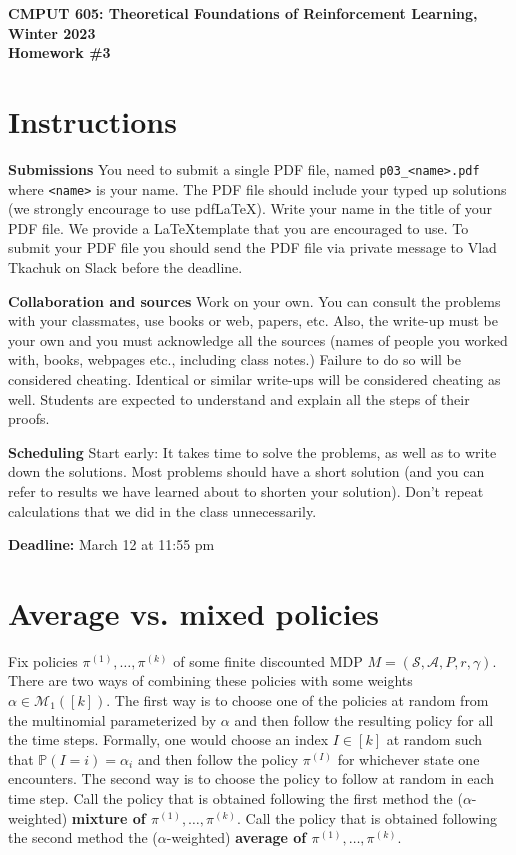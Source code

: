 \documentclass{article}
\newcommand{\hwnumber}{3}
\DeclareMathOperator*{\1}{\mathbbm{1}}
\newcommand{\Prob}[1]{\mathbb{P}( #1 )}
\newcommand{\0}{\mathbf{0}}
\theoremstyle{definition}
\theoremstyle{remark}
\theoremstyle{theorem}
\newcommand{\cS}{\mathcal{S}}
\newcommand{\cA}{\mathcal{A}}
\begin{document}
\begin{center}
{\Large \textbf{CMPUT 605: Theoretical Foundations of Reinforcement Learning, Winter 2023\\ Homework \#\hwnumber}}
\end{center}

\section*{Instructions}
\textbf{Submissions}
You need to submit a single PDF file, named {\tt p0\hwnumber\_<name>.pdf} where {\tt <name>} is your name.
The PDF file should include your typed up solutions (we strongly encourage to use pdf\LaTeX). 
Write your name in the title of your PDF file.
We provide a \LaTeX template that you are encouraged to use.
To submit your PDF file you should send the PDF file via private message to Vlad Tkachuk on Slack before the deadline.

\textbf{Collaboration and sources}
Work on your own. You can consult the problems with your classmates, use books
or web, papers, etc.
Also, the write-up must be your own and you must acknowledge all the
sources (names of people you worked with, books, webpages etc., including class notes.)
Failure to do so will be considered cheating.
Identical or similar write-ups will be considered cheating as well.
Students are expected to understand and explain all the steps of their proofs.

\textbf{Scheduling}
Start early: It takes time to solve the problems, as well as to write down the solutions. Most problems should have a short solution (and you can refer to results we have learned about to shorten your solution). Don't repeat calculations that we did in the class unnecessarily.

\vspace{0.3cm}

\textbf{Deadline:} March 12 at 11:55 pm

\newcommand{\cM}{\mathcal{M}}
\newcommand{\nS}{\mathrm{S}}
\newcommand{\nA}{\mathrm{A}}
\newcommand{\PP}{\mathbb{P}}
\newcommand{\RR}{\mathbb{R}}
\newcommand{\ip}[1]{\langle #1 \rangle}


\section*{Average vs. mixed policies}
Fix policies $\pi^{(1)},\dots,\pi^{(k)}$ of some finite discounted MDP $M=(\cS,\cA,P,r,\gamma)$.
There are two ways of combining these policies with
some weights $\alpha\in \cM_1([k])$.
The first way is to choose one of the policies at random from the multinomial parameterized by $\alpha$
and then follow the resulting policy for all the time steps.
Formally, one would choose
an index $I\in [k]$ at random such that $\Prob{I=i} = \alpha_i$
and then follow the policy $\pi^{(I)}$ for whichever state one encounters.
The second way is to choose the policy to follow at random in each time step.
Call the policy that is obtained following the first method the ($\alpha$-weighted) \textbf{mixture of $\pi^{(1)},\dots,\pi^{(k)}$}.
Call the policy that is obtained following the second method the ($\alpha$-weighted)
\textbf{average of $\pi^{(1)},\dots,\pi^{(k)}$}.
\end{document}
